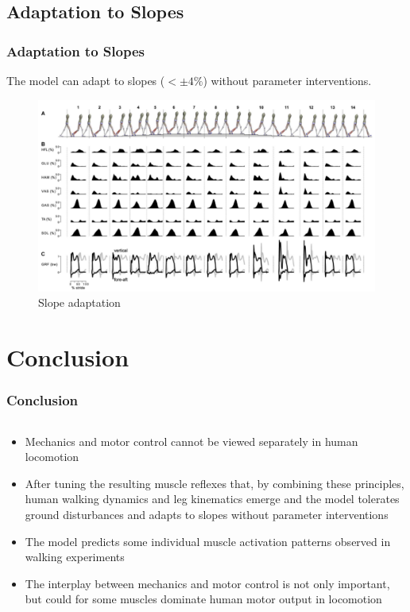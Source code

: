 \documentclass[10pt]{beamer}
\begin{document}
	\subsection[Results]{Adaptation to Slopes}
	
	\begin{frame}
		\frametitle{Adaptation to Slopes}
		
		The model can adapt to slopes ($ < \pm 4\% $) without parameter interventions.
		
		\begin{figure}
			\centering
			\includegraphics[height=.65\textheight]{images/slope_adaptation.pdf}
			\caption{Slope adaptation}	
		\end{figure}
		
	\end{frame}
	
	\section{Conclusion}	
	\begin{frame}
		\frametitle{Conclusion}
		
		\begin{columns}
			\begin{column}{1.0\textwidth}
				\begin{itemize}
					\item Mechanics and motor control cannot be viewed separately in human locomotion
					\item After tuning the resulting muscle reflexes that, by combining these principles, human walking dynamics and leg kinematics emerge and the model tolerates ground disturbances and adapts to slopes without parameter interventions
					\item The model predicts some individual muscle activation patterns observed in walking experiments
					\item The interplay between mechanics and motor control is not only important, but could for some muscles dominate human motor output in locomotion
				\end{itemize}
			\end{column}
		\end{columns}
	\end{frame}
	
\end{document}
